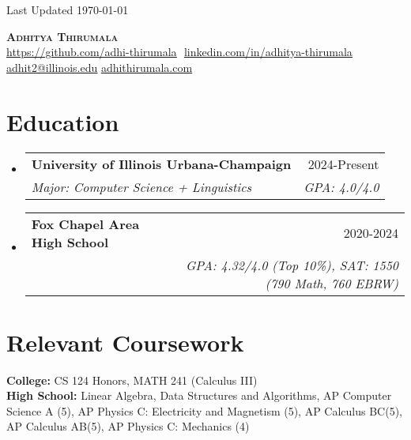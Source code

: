 \documentclass{article}
\makeatletter
\newcommand{\resumeSubheading}[4]{
  \vspace{-2pt}\item
    \begin{tabular*}{0.97\textwidth}[t]{l@{\extracolsep{\fill}}r}
      \textbf{#1} & #2 \\
      \textit{\small#3} & \textit{\small #4} \\
    \end{tabular*}\vspace{-7pt}
}
\newcommand{\resumeSubHeadingListStart}{\begin{itemize}[leftmargin=0.15in, label={}]}
\newcommand{\resumeSubHeadingListEnd}{\end{itemize}}
\makeatother
\begin{document}
\begin{flushright}
	\vspace{-4pt}
	\color{gray}
	\item
	Last Updated \today
\end{flushright}

\vspace{-7pt}

\begin{center}
	\textbf{{\Huge\scshape Adhitya Thirumala}} \\ \vspace{8pt}
	\small
	\href{https://github.com/adhi-thirumala}{\underline{https://github.com/adhi-thirumala}} $  $
	\href{www.linkedin.com/in/adhitya-thirumala}
	{\underline{linkedin.com/in/adhitya-thirumala}} $  $
	\href{mailto:adhit2@illinois.edu}
	{\underline{adhit2@illinois.edu}}
	\href{https://www.adhithirumala.com}
	{\underline{adhithirumala.com}} $  $


\end{center}

\section{Education}
\resumeSubHeadingListStart

\resumeSubheading{University of Illinois Urbana-Champaign} {2024-Present} {Major: Computer Science + Linguistics}{GPA: 4.0/4.0}
\resumeSubheading
{Fox Chapel Area High School}{2020-2024}
{}{GPA: 4.32/4.0 (Top 10\%), SAT: 1550 (790 Math, 760 EBRW)}
\resumeSubHeadingListEnd
\vspace{-15pt}
\section{Relevant Coursework}
\begin{itemize}[leftmargin=0.15in, label={}]
	\small{\item{
		           \textbf{College: }{CS 124 Honors, MATH 241 (Calculus III)}\\
		            \textbf{High School:}{ Linear Algebra, Data Structures and Algorithms, AP Computer Science A (5), AP Physics C: Electricity and Magnetism (5), AP Calculus BC(5), AP Calculus AB(5), AP Physics C: Mechanics (4)} \\

		      }}
\end{itemize}
\end{document}
